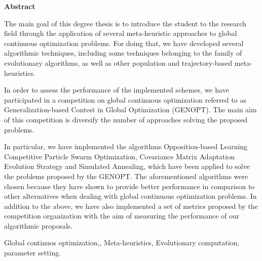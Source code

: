 \documentclass[spanish,a4paper,14pt,oneside]{extreport}
\newenvironment{summary}
{\par\noindent\begin{center}\textbf{Abstract}\end{center}\begin{itshape}\par\noindent}
{\end{itshape}}
\newenvironment{keywords}
{\begin{list}{}{\setlength{\leftmargin}{1em}}\item[\hskip\labelsep \bfseries Keywords:]}
{\end{list}}
\begin{document}
\newpage  %
\begin{summary}
{\em

The main goal of this degree thesis is to introduce the student to the research field through the application of several meta-heuristic approaches to global continuous optimization problems. For doing that, we have developed several algorithmic techniques, including some techniques belonging to the family of evolutionary algorithms, as well as other population and trajectory-based meta-heuristics.

In order to assess the performance of the implemented schemes, we have participated in a competition on global continuous optimization referred to as Generalization-based Contest in Global Optimization (GENOPT). The main aim of this competition is diversify the number of approaches solving the proposed problems.

In particular, we have implemented the algorithms Opposition-based Learning Competitive Particle Swarm Optimization, Covariance Matrix Adaptation Evolution Strategy and Simulated Annealing, which have been applied to solve the problems proposed by the GENOPT. The aforementioned algorithms were chosen because they have shown to provide better performance in comparison to other alternatives when dealing with global continuous optimization problems. In addition to the above, we have also implemented a set of metrics proposed by the competition organization with the aim of measuring the performance of our algorithmic proposals.

}

\begin{keywords}
Global continuos optimization,, Meta-heuristics, Evolutionary computation, parameter setting.
\end{keywords}

\end{summary}

\newpage{\pagestyle{empty}}
\thispagestyle{empty}



\pagestyle{myheadings} %
\end{document}
